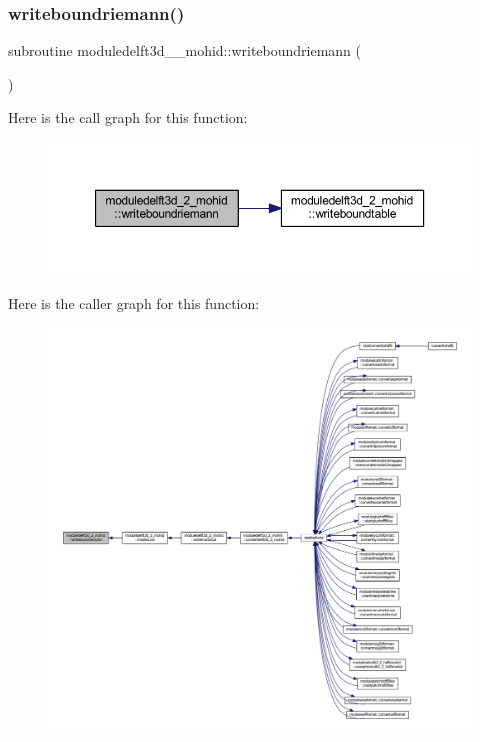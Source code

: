 \subsubsection{\texorpdfstring{writeboundriemann()}{writeboundriemann()}}
{\footnotesize\ttfamily subroutine moduledelft3d\+\_\+\_\+mohid\+::writeboundriemann (\begin{DoxyParamCaption}{ }\end{DoxyParamCaption})\hspace{0.3cm}{\ttfamily [private]}}

Here is the call graph for this function\+:\nopagebreak
\begin{figure}[H]
\begin{center}
\leavevmode
\includegraphics[width=350pt]{namespacemoduledelft3d__2__mohid_a1a45560fe1480c753bc904201b817966_cgraph}
\end{center}
\end{figure}
Here is the caller graph for this function\+:\nopagebreak
\begin{figure}[H]
\begin{center}
\leavevmode
\includegraphics[width=350pt]{namespacemoduledelft3d__2__mohid_a1a45560fe1480c753bc904201b817966_icgraph}
\end{center}
\end{figure}
\mbox{\label{namespacemoduledelft3d__2__mohid_a8b7bcfa950bb28feff319224f0ee581e}} 
